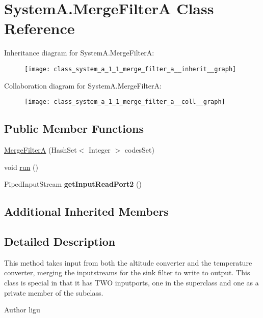 \hypertarget{class_system_a_1_1_merge_filter_a}{}\section{System\+A.\+Merge\+Filter\+A Class Reference}
\label{class_system_a_1_1_merge_filter_a}


Inheritance diagram for System\+A.\+Merge\+Filter\+A\+:
\nopagebreak
\begin{figure}[H]
\begin{center}
\leavevmode
\texttt{[image: class\_system\_a\_1\_1\_merge\_filter\_a\_\_inherit\_\_graph]}
\end{center}
\end{figure}


Collaboration diagram for System\+A.\+Merge\+Filter\+A\+:
\nopagebreak
\begin{figure}[H]
\begin{center}
\leavevmode
\texttt{[image: class\_system\_a\_1\_1\_merge\_filter\_a\_\_coll\_\_graph]}
\end{center}
\end{figure}
\subsection*{Public Member Functions}
\begin{DoxyCompactItemize}
\item 
\hyperlink{class_system_a_1_1_merge_filter_a_acdc58d2d95e2a59ff8a6731aa18d7c2d}{Merge\+Filter\+A} (Hash\+Set$<$ Integer $>$ codes\+Set)
\item 
void \hyperlink{class_system_a_1_1_merge_filter_a_acab836dc5b0be101c3da5ab856477172}{run} ()
\item 
\hypertarget{class_system_a_1_1_merge_filter_a_a2448cf368797f26dc1eacf80a1a1ece4}{}Piped\+Input\+Stream {\bfseries get\+Input\+Read\+Port2} ()\label{class_system_a_1_1_merge_filter_a_a2448cf368797f26dc1eacf80a1a1ece4}

\end{DoxyCompactItemize}
\subsection*{Additional Inherited Members}


\subsection{Detailed Description}
This method takes input from both the altitude converter and the temperature converter, merging the inputstreams for the sink filter to write to output. This class is special in that it has T\+W\+O inputports, one in the superclass and one as a private member of the subclass. \begin{DoxyAuthor}{Author}
ligu 
\end{DoxyAuthor}


